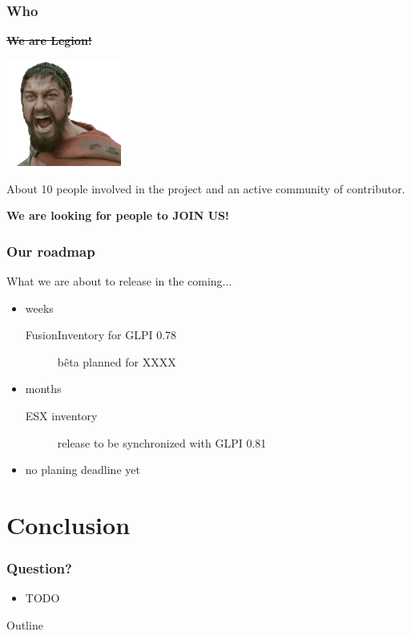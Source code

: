 \documentclass{beamer}
\begin{document}
\begin{frame}
    \frametitle{Who}

    \sout{\bf{We are Legion!}}
    \begin{center}
    \includegraphics[height=3.5cm]{./pics/sparta.jpg}
    \end{center}

    About 10 people involved in the project and an active community of contributor.

    \pause
    \bf{We are looking for people to JOIN US!}
\end{frame}

\begin{frame}
    \frametitle{Our roadmap}

    What we are about to release in the coming...
    \begin{itemize}
        \item weeks
        \begin{description}
            \item[FusionInventory for GLPI 0.78] bêta planned for XXXX
        \end{description}
        \item months
        \begin{description}
            \item[ESX inventory] release to be synchronized with GLPI 0.81
        \end{description}
        \item no planing deadline yet
    \end{itemize}
\end{frame}

\section{Conclusion}

\begin{frame}
    \frametitle{Question?}
    
    \begin{itemize}
        \item TODO
    \end{itemize}
\end{frame}

\begin{frame}[shrink=20]{Outline}

    \tableofcontents
\end{frame}
\end{document}

